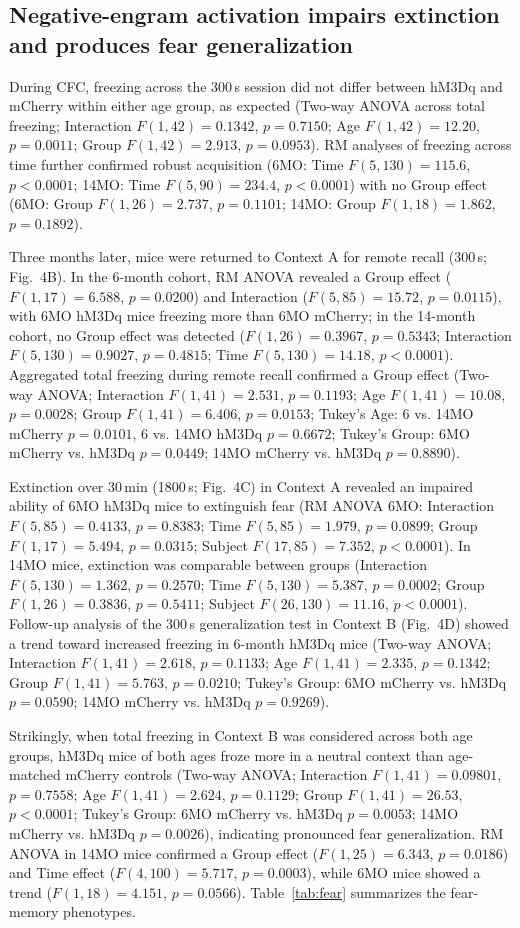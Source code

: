 \documentclass[11pt]{article}
\begin{document}
\subsection{Negative-engram activation impairs extinction and produces fear generalization}
During CFC, freezing across the 300\,s session did not differ between hM3Dq and mCherry within either age group, as expected (Two-way ANOVA across total freezing; Interaction $F(1,42)=0.1342$, $p=0.7150$; Age $F(1,42)=12.20$, $p=0.0011$; Group $F(1,42)=2.913$, $p=0.0953$). RM analyses of freezing across time further confirmed robust acquisition (6MO: Time $F(5,130)=115.6$, $p<0.0001$; 14MO: Time $F(5,90)=234.4$, $p<0.0001$) with no Group effect (6MO: Group $F(1,26)=2.737$, $p=0.1101$; 14MO: Group $F(1,18)=1.862$, $p=0.1892$).

Three months later, mice were returned to Context A for remote recall (300\,s; Fig.~4B). In the 6-month cohort, RM ANOVA revealed a Group effect ($F(1,17)=6.588$, $p=0.0200$) and Interaction ($F(5,85)=15.72$, $p=0.0115$), with 6MO hM3Dq mice freezing more than 6MO mCherry; in the 14-month cohort, no Group effect was detected ($F(1,26)=0.3967$, $p=0.5343$; Interaction $F(5,130)=0.9027$, $p=0.4815$; Time $F(5,130)=14.18$, $p<0.0001$). Aggregated total freezing during remote recall confirmed a Group effect (Two-way ANOVA; Interaction $F(1,41)=2.531$, $p=0.1193$; Age $F(1,41)=10.08$, $p=0.0028$; Group $F(1,41)=6.406$, $p=0.0153$; Tukey's Age: 6 vs. 14MO mCherry $p=0.0101$, 6 vs. 14MO hM3Dq $p=0.6672$; Tukey's Group: 6MO mCherry vs. hM3Dq $p=0.0449$; 14MO mCherry vs. hM3Dq $p=0.8890$).

Extinction over 30\,min (1800\,s; Fig.~4C) in Context A revealed an impaired ability of 6MO hM3Dq mice to extinguish fear (RM ANOVA 6MO: Interaction $F(5,85)=0.4133$, $p=0.8383$; Time $F(5,85)=1.979$, $p=0.0899$; Group $F(1,17)=5.494$, $p=0.0315$; Subject $F(17,85)=7.352$, $p<0.0001$). In 14MO mice, extinction was comparable between groups (Interaction $F(5,130)=1.362$, $p=0.2570$; Time $F(5,130)=5.387$, $p=0.0002$; Group $F(1,26)=0.3836$, $p=0.5411$; Subject $F(26,130)=11.16$, $p<0.0001$). Follow-up analysis of the 300\,s generalization test in Context B (Fig.~4D) showed a trend toward increased freezing in 6-month hM3Dq mice (Two-way ANOVA; Interaction $F(1,41)=2.618$, $p=0.1133$; Age $F(1,41)=2.335$, $p=0.1342$; Group $F(1,41)=5.763$, $p=0.0210$; Tukey's Group: 6MO mCherry vs. hM3Dq $p=0.0590$; 14MO mCherry vs. hM3Dq $p=0.9269$).

Strikingly, when total freezing in Context B was considered across both age groups, hM3Dq mice of both ages froze more in a neutral context than age-matched mCherry controls (Two-way ANOVA; Interaction $F(1,41)=0.09801$, $p=0.7558$; Age $F(1,41)=2.624$, $p=0.1129$; Group $F(1,41)=26.53$, $p<0.0001$; Tukey's Group: 6MO mCherry vs. hM3Dq $p=0.0053$; 14MO mCherry vs. hM3Dq $p=0.0026$), indicating pronounced fear generalization. RM ANOVA in 14MO mice confirmed a Group effect ($F(1,25)=6.343$, $p=0.0186$) and Time effect ($F(4,100)=5.717$, $p=0.0003$), while 6MO mice showed a trend ($F(1,18)=4.151$, $p=0.0566$). Table~\ref{tab:fear} summarizes the fear-memory phenotypes.
\end{document}
